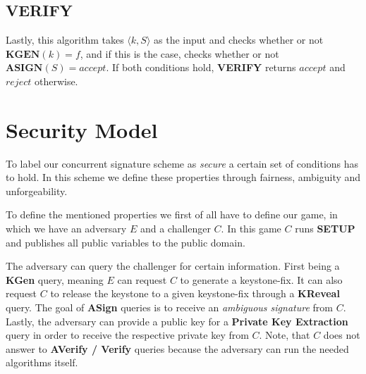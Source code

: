 \documentclass[final]{IEEEtran}%
\newcommand{\goedel}[1]{\langle #1 \rangle}
\begin{document}
  \subsection{\textbf{VERIFY}}
    Lastly, this algorithm takes \(\goedel{k,S}\) as the input and checks whether or not \(\textbf{KGEN}(k) = f\), and if this is the case, checks whether or not \(\textbf{ASIGN}(S)=accept\).
    If both conditions hold, \textbf{VERIFY} returns \(accept\) and \(reject\) otherwise.

\section{Security Model}
  To label our concurrent signature scheme as \textit{secure} a certain set of conditions has to hold. 
  In this scheme we define these properties through fairness, ambiguity and unforgeability.
  
  To define the mentioned properties we first of all have to define our game, in which we have an adversary \(E\) and a challenger \(C\).
  In this game \(C\) runs \textbf{SETUP} and publishes all public variables to the public domain. 
  
  The adversary can query the challenger for certain information. 
  First being a \textbf{KGen} query, meaning \(E\) can request \(C\) to generate a keystone-fix.
  It can also request \(C\) to release the keystone to a given keystone-fix through a \textbf{KReveal} query.
  The goal of \textbf{ASign} queries is to receive an \textit{ambiguous signature} from \(C\). 
  Lastly, the adversary can provide a public key for a \textbf{Private Key Extraction} query in order to receive the respective private key from \(C\).
  Note, that \(C\) does not answer to \textbf{AVerify / Verify} queries because the adversary can run the needed algorithms itself.
\end{document}
